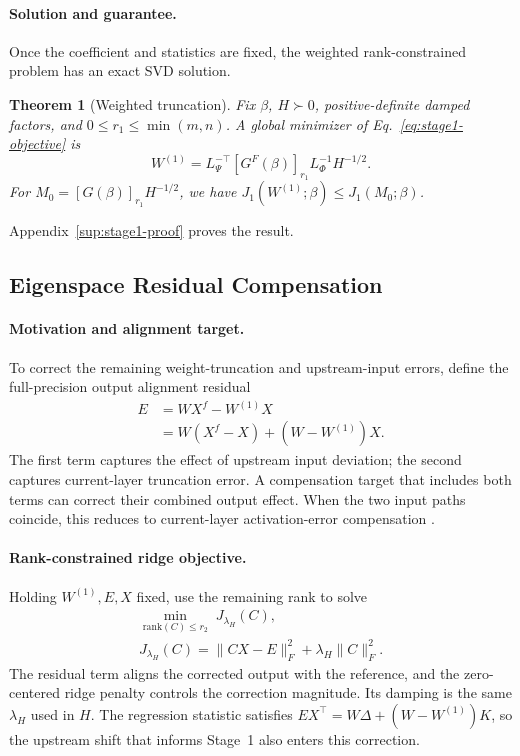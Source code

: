 \documentclass[11pt]{article}
\newtheorem{theorem}{Theorem}
\begin{document}
\paragraph{Solution and guarantee.}
Once the coefficient and statistics are fixed, the weighted rank-constrained problem has an exact SVD solution.
\begin{theorem}[Weighted truncation]\label{thm:fisher}
Fix $\beta$, $H\succ0$, positive-definite damped factors, and $0\le r_1\le\min(m,n)$. A global minimizer of Eq.~\eqref{eq:stage1-objective} is
\begin{equation}
W^{(1)}=L_\Psi^{-\top}[G^F(\beta)]_{r_1}
L_\Phi^{-1}H^{-1/2}.
\label{eq:stage1-output}
\end{equation}
For $M_0=[G(\beta)]_{r_1}H^{-1/2}$, we have $J_1(W^{(1)};\beta)\le J_1(M_0;\beta)$.
\end{theorem}
Appendix~\ref{sup:stage1-proof} proves the result.

\subsection{Eigenspace Residual Compensation}\label{sec:eigenspace-comp}

\paragraph{Motivation and alignment target.}
To correct the remaining weight-truncation and upstream-input errors, define the full-precision output alignment residual
\begin{equation}
\begin{aligned}
E&=WX^f-W^{(1)}X\\
 &=W(X^f-X)+(W-W^{(1)})X.
\end{aligned}
\label{eq:global-alignment-error}
\end{equation}
The first term captures the effect of upstream input deviation; the second captures current-layer truncation error. A compensation target that includes both terms can correct their combined output effect. When the two input paths coincide, this reduces to current-layer activation-error compensation \citep{liu2025eora}.

\paragraph{Rank-constrained ridge objective.}
Holding $W^{(1)},E,X$ fixed, use the remaining rank to solve
\begin{equation}
\begin{aligned}
\min_{\mathrm{rank}(C)\le r_2}\;J_{\lambda_H}(C),\\
J_{\lambda_H}(C)=\|CX-E\|_F^2+\lambda_H\|C\|_F^2.
\end{aligned}
\label{eq:stage2-objective}
\end{equation}
The residual term aligns the corrected output with the reference, and the zero-centered ridge penalty controls the correction magnitude. Its damping is the same $\lambda_H$ used in $H$. The regression statistic satisfies $EX^\top=W\Delta+(W-W^{(1)})K$, so the upstream shift that informs Stage~1 also enters this correction.
\end{document}
